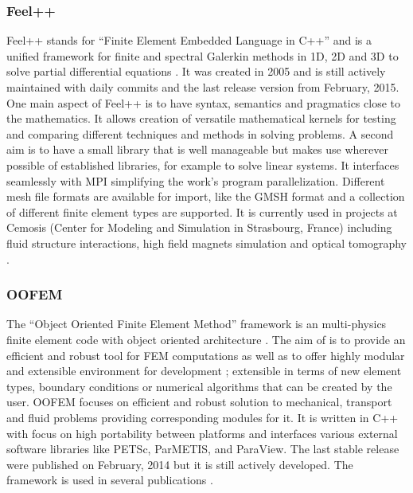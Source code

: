   \subsubsection{Feel++}
  Feel++ stands for "`Finite Element Embedded Language in C++"' and is a unified framework for finite and spectral Galerkin methods in 1D, 2D and 3D to solve partial differential equations \cite{prud2012feel++}. It was created in 2005 and is still actively maintained with daily commits and the last release version from February, 2015.
  One main aspect of Feel++ is to have syntax, semantics and pragmatics close to the mathematics. It allows creation of versatile mathematical kernels for testing and comparing different techniques and methods in solving problems. A second aim is to have a small library that is well manageable but makes use wherever possible of established libraries, for example to solve linear systems.
  It interfaces seamlessly with MPI simplifying the work's program parallelization. Different mesh file formats are available for import, like the GMSH format and a collection of different finite element types are supported.
  It is currently used in projects at Cemosis (Center for Modeling and Simulation in Strasbourg, France) including fluid structure interactions, high field magnets simulation and optical tomography \cite{feelpp}.


  \subsubsection{OOFEM}\cite{oofem}
  The "`Object Oriented Finite Element Method"' framework is an multi-physics finite element code with object oriented architecture \cite{patzak2001design}. The aim of is to provide an efficient and robust tool for FEM computations as well as to offer highly modular and extensible environment for development \cite{oofem}; extensible in terms of new element types, boundary conditions or numerical algorithms that can be created by the user. OOFEM focuses on efficient and robust solution to mechanical, transport and fluid problems providing corresponding modules for it. It is written in C++ with focus on high portability between platforms and interfaces various external software libraries like PETSc, ParMETIS, and ParaView. The last stable release were published on February, 2014 but it is still actively developed. The framework is used in several publications \cite{oofemPubs}.
  
